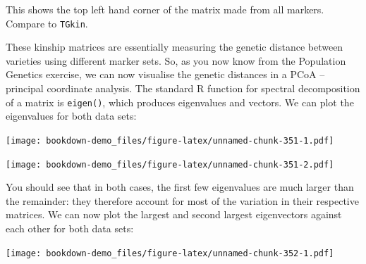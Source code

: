 \documentclass[
]{book}
\newenvironment{Shaded}{\begin{snugshade}}{\end{snugshade}}
\newcommand{\DecValTok}[1]{\textcolor[rgb]{0.00,0.00,0.81}{#1}}
\newcommand{\FunctionTok}[1]{\textcolor[rgb]{0.00,0.00,0.00}{#1}}
\newcommand{\NormalTok}[1]{#1}
\newcommand{\SpecialCharTok}[1]{\textcolor[rgb]{0.00,0.00,0.00}{#1}}
\begin{document}
This shows the top left hand corner of the matrix made from all markers. Compare to \texttt{TGkin}.

These kinship matrices are essentially measuring the genetic distance between varieties using different marker sets. So, as you now know from the Population Genetics exercise, we can now visualise the genetic distances in a PCoA -- principal coordinate analysis. The standard R function for spectral decomposition of a matrix is \texttt{eigen()}, which produces eigenvalues and vectors. We can plot the eigenvalues for both data sets:

\begin{Shaded}
\end{Shaded}

\texttt{[image: bookdown-demo\_files/figure-latex/unnamed-chunk-351-1.pdf]}

\begin{Shaded}
\end{Shaded}

\texttt{[image: bookdown-demo\_files/figure-latex/unnamed-chunk-351-2.pdf]}

You should see that in both cases, the first few eigenvalues are much larger than the remainder: they therefore account for most of the variation in their respective matrices. We can now plot the largest and second largest eigenvectors against each other for both data sets:

\begin{Shaded}
\end{Shaded}

\texttt{[image: bookdown-demo\_files/figure-latex/unnamed-chunk-352-1.pdf]}

\begin{Shaded}
\end{Shaded}
\end{document}
